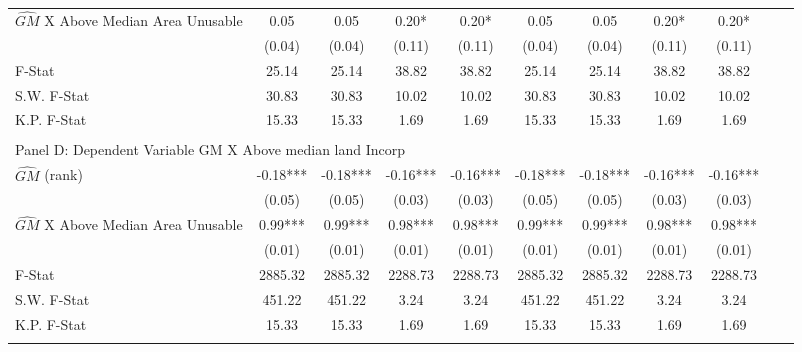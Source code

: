 \begin{table}[htbp]
\begin{threeparttable}
\begin{tabular}{l*{10}{c}}
\addlinespace
$\hat{GM}$ X Above Median Area Unusable&       0.05   &       0.05   &       0.20*  &       0.20*  &       0.05   &       0.05   &       0.20*  &       0.20*  \\
                &     (0.04)   &     (0.04)   &     (0.11)   &     (0.11)   &     (0.04)   &     (0.04)   &     (0.11)   &     (0.11)   \\
\midrule
F-Stat          &      25.14   &      25.14   &      38.82   &      38.82   &      25.14   &      25.14   &      38.82   &      38.82   \\
S.W. F-Stat     &      30.83   &      30.83   &      10.02   &      10.02   &      30.83   &      30.83   &      10.02   &      10.02   \\
K.P. F-Stat     &      15.33   &      15.33   &       1.69   &       1.69   &      15.33   &      15.33   &       1.69   &       1.69   \\
\cmidrule[\heavyrulewidth](lr){1-9} \\ \cmidrule[\heavyrulewidth](lr){1-9}
\multicolumn{8}{l}{Panel D: Dependent Variable GM X Above median land Incorp}\\
\cmidrule(lr){1-9}
$\hat{GM}$ (rank)&      -0.18***&      -0.18***&      -0.16***&      -0.16***&      -0.18***&      -0.18***&      -0.16***&      -0.16***\\
                &     (0.05)   &     (0.05)   &     (0.03)   &     (0.03)   &     (0.05)   &     (0.05)   &     (0.03)   &     (0.03)   \\
\addlinespace
$\hat{GM}$ X Above Median Area Unusable&       0.99***&       0.99***&       0.98***&       0.98***&       0.99***&       0.99***&       0.98***&       0.98***\\
                &     (0.01)   &     (0.01)   &     (0.01)   &     (0.01)   &     (0.01)   &     (0.01)   &     (0.01)   &     (0.01)   \\
\midrule
F-Stat          &    2885.32   &    2885.32   &    2288.73   &    2288.73   &    2885.32   &    2885.32   &    2288.73   &    2288.73   \\
S.W. F-Stat     &     451.22   &     451.22   &       3.24   &       3.24   &     451.22   &     451.22   &       3.24   &       3.24   \\
K.P. F-Stat     &      15.33   &      15.33   &       1.69   &       1.69   &      15.33   &      15.33   &       1.69   &       1.69   \\
\cmidrule[\heavyrulewidth](lr){1-9} \\ \cmidrule[\heavyrulewidth](lr){1-9}

\end{tabular}
\end{threeparttable}
\end{table}

